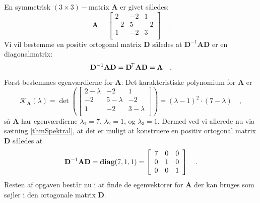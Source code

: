 \begin{example} \label{exampLAbog8.16}
En symmetrisk $(3 \times 3)-$matrix $\mathbf{A}$ er givet således:
\begin{equation}
\mathbf{A} = \left[
               \begin{array}{rrr}
                 2 & -2 & 1 \\
                 -2 & 5 & -2 \\
                 1 & -2 & 3 \\
               \end{array}
             \right] \quad .
\end{equation}
Vi vil bestemme en positiv ortogonal matrix $\mathbf{D}$ således at $\mathbf{D}^{-1}\mathbf{A}\mathbf{D}$ er en diagonalmatrix:
\begin{equation}
\mathbf{D}^{-1}\mathbf{A}\mathbf{D} = \mathbf{D}\hspace*{-.6mm}^{\top}\mathbf{A}\mathbf{D} =  \mathbf{\Lambda} \quad .
\end{equation}
Først bestemmes egenværdierne for $\mathbf{A}$: Det karakteristiske polynomium for $\mathbf{A}$ er
\begin{equation}
\mathcal{K}_{\mathbf{A}}(\lambda) = \det\left(\left[
               \begin{array}{rrr}
                 2-\lambda & -2 & 1 \\
                 -2 & 5-\lambda  & -2 \\
                 1 & -2 & 3-\lambda  \\
               \end{array}
             \right] \right)  = (\lambda-1)^{2}\cdot(7-\lambda) \quad ,
\end{equation}
så $\mathbf{A}$ har egenværdierne $\lambda_{1} = 7$, $\lambda_{2} = 1$, og $\lambda_{3} = 1$.
Dermed ved vi allerede nu via sætning \ref{thmSpektral}, at det er muligt at konstruere en positiv ortogonal matrix $\mathbf{D}$ således at
\begin{equation}
\mathbf{D}^{-1}\mathbf{A}\mathbf{D} = \operatorname{\bf{diag}}(7,1,1) = \left[
                                           \begin{array}{rrr}
                                             7 & 0 & 0 \\
                                             0 & 1 & 0 \\
                                             0 & 0 & 1 \\
                                           \end{array}
                                         \right] \quad .
\end{equation}
Resten af opgaven består nu i at finde de egenvektorer for $\mathbf{A}$ der kan bruges som søjler i den ortogonale matrix $\mathbf{D}$. \\


\end{example}
